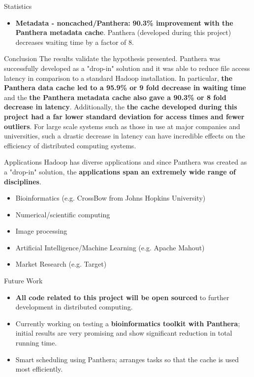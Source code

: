 \documentclass[final]{beamer} %
\begin{document}
\begin{frame}
\begin{columns}[t]
\begin{column}{0.32\textwidth}
\begin{block}{Statistics}
\begin{itemize}
    		\item \textbf{Metadata - noncached/Panthera: } \textbf{90.3\% improvement with the Panthera metadata cache}. Panthera (developed during this project) decreases waiting time by a factor of 8.
    		
	\end{itemize}    	    
    \end{block}
    
    	\begin{block}{Conclusion}
	The results validate the hypothesis presented. Panthera was successfully developed as a "drop-in" solution and it was able to reduce file access latency in comparison to a standard Hadoop installation. In particular, \textbf{the Panthera data cache led to a 95.9\% or 9 fold decrease in waiting time} and the \textbf{the Panthera metadata cache also gave a 90.3\% or 8 fold decrease in latency}. Additionally, the \textbf{the cache developed during this project had a far lower standard deviation for access times and fewer outliers}. For large scale systems such as those in use at major companies and universities, such a drastic decrease in latency can have incredible effects on the efficiency of distributed computing systems.
	
	\end{block}
	
	\begin{block}{Applications}
	Hadoop has diverse applications and since Panthera was created as a "drop-in" solution, the \textbf{applications span an extremely wide range of disciplines}.
	\begin{itemize}
		\item Bioinformatics (e.g. CrossBow from Johns Hopkins University)
		\item Numerical/scientific computing 
		\item Image processing
		\item Artificial Intelligence/Machine Learning (e.g. Apache Mahout)
		\item Market Research (e.g. Target)
	\end{itemize}
	\end{block}
	
	\begin{block}{Future Work}
	\begin{itemize}
		\item \textbf{All code related to this project will be open sourced} to further development in distributed computing.
		\item Currently working on testing a \textbf{bioinformatics toolkit with Panthera}; initial results are very promising and show significant reduction in total running time.
		\item Smart scheduling using Panthera; arranges tasks so that the cache is used most efficiently.
		
	\end{itemize}
	\end{block}
      \end{column}
    \end{columns}
  \end{frame}
    
  
\end{document}
